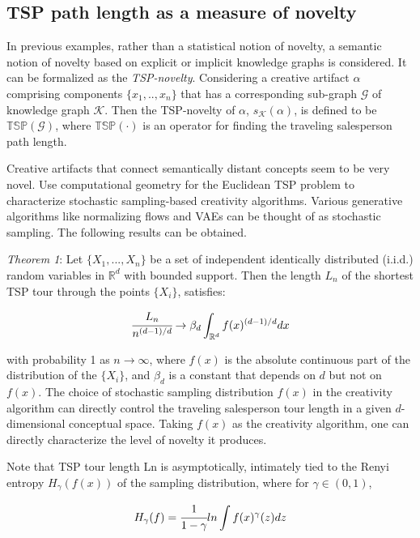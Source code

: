 \documentclass[]{article}
\begin{document}
\subsection{TSP path length as a measure of novelty}
In previous examples, rather than a statistical notion of novelty, a semantic notion of novelty based on explicit or implicit knowledge graphs is considered. 
It can be formalized as the \textit{TSP-novelty}. Considering a creative artifact $\alpha$ comprising components $\{x_1,..,x_n\}$ that has a corresponding sub-graph $\mathcal{G}$ of knowledge graph $\mathcal{K}$. Then the TSP-novelty of $\alpha$, $s_\mathcal{K}(\alpha)$, is defined to be $\mathbb{TSP}(\mathcal{G})$, where $\mathbb{TSP}(\cdot)$ is an operator for finding the traveling salesperson path length. 

Creative artifacts that connect semantically distant concepts seem to be very novel. 
Use computational geometry for the Euclidean TSP problem to characterize stochastic sampling-based creativity algorithms. Various generative algorithms like normalizing flows and VAEs can be thought of as stochastic sampling.
The following results can be obtained. 

\noindent\textit{Theorem 1}: Let $\{X_1,...,X_n\}$ be a set of independent identically distributed (i.i.d.) random variables in $\mathbb{R}^d$ with bounded support.
Then the length $L_n$ of the shortest TSP tour through the points $\{X_i\}$, satisfies: 

\begin{equation*}
    \cfrac{L_n}{n^{(d-1)/d}}\rightarrow\beta_d\int_{\mathbb{R}^d}f(x)^{(d-1)/d}dx
\end{equation*}


\noindent with probability 1 as $n\rightarrow \infty$, where $f(x)$ is the absolute continuous part of the distribution of the $\{X_i\}$, and $\beta_d$ is a constant that depends on $d$ but not on $f(x)$.
The choice of stochastic sampling distribution $f(x)$ in the creativity algorithm can directly control the traveling salesperson tour length in a given $d$-dimensional conceptual space. 
Taking $f(x)$ as the creativity algorithm, one can directly characterize the level of novelty it produces. 

Note that TSP tour length Ln is asymptotically, intimately tied to the Renyi entropy $H_\gamma(f(x))$ of the sampling distribution, where for $\gamma\in(0,1)$,

\begin{equation*}
    H_\gamma(f)=\cfrac{1}{1-\gamma}ln\int f(x)^\gamma(z)dz
\end{equation*}
\end{document}

